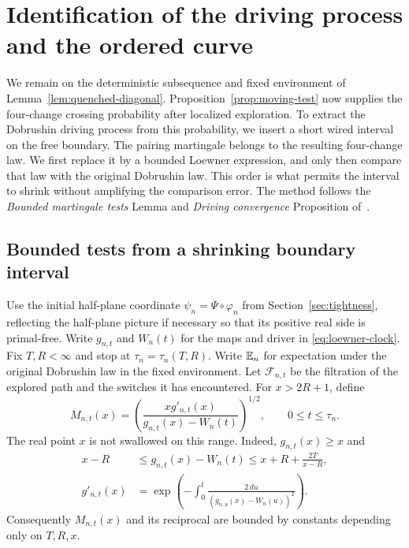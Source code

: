 \section{Identification of the driving process and the ordered curve}
\label{sec:identification}

We remain on the deterministic subsequence and fixed environment of
Lemma~\ref{lem:quenched-diagonal}.  Proposition~\ref{prop:moving-test}
now supplies the four-change crossing probability after localized
exploration.  To extract the Dobrushin driving process from this
probability, we insert a short wired interval on the free boundary.
The pairing martingale belongs to the resulting four-change law.
We first replace it by a bounded Loewner expression, and only then
compare that law with the original Dobrushin law.  This order is
what permits the interval to shrink without amplifying the
comparison error.  The method follows the \emph{Bounded martingale
tests} Lemma and \emph{Driving convergence} Proposition
of~\cite[Section ``Identification of the Dobrushin strand'']{C}.

\subsection{Bounded tests from a shrinking boundary interval}

Use the initial half-plane coordinate
$\psi_n=\Psi\circ\varphi_n$ from Section~\ref{sec:tightness},
reflecting the half-plane picture if necessary so that its positive
real side is primal-free.
Write $g_{n,t}$ and $W_n(t)$ for the maps and driver in
\eqref{eq:loewner-clock}.  Fix $T,R<\infty$ and stop at
$\tau_n=\tau_n(T,R)$.  Write $\mathbb E_n$ for expectation under the
original Dobrushin law in the fixed environment.  Let
$\mathcal F_{n,t}$ be the filtration of
the explored path and the switches it has encountered.  For
$x>2R+1$, define
\begin{equation}\label{eq:power-test}
 M_{n,t}(x)=
 \left(\frac{xg'_{n,t}(x)}{g_{n,t}(x)-W_n(t)}\right)^{1/2},
 \qquad 0\le t\le\tau_n.
\end{equation}
The real point $x$ is not swallowed on this range.  Indeed,
$g_{n,t}(x)\ge x$ and
\begin{equation}\label{eq:real-flow-bounds}
 \begin{split}
 x-R&\le g_{n,t}(x)-W_n(t)
       \le x+R+\frac{2T}{x-R},\\
 g'_{n,t}(x)&=
 \exp\left(-\int_0^t
       \frac{2\,du}{(g_{n,u}(x)-W_n(u))^2}\right).
 \end{split}
\end{equation}
Consequently $M_{n,t}(x)$ and its reciprocal are bounded by
constants depending only on $T,R,x$.


